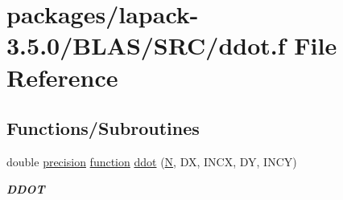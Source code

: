 \hypertarget{lapack-3_85_80_2BLAS_2SRC_2ddot_8f}{}\section{packages/lapack-\/3.5.0/\+B\+L\+A\+S/\+S\+R\+C/ddot.f File Reference}
\label{lapack-3_85_80_2BLAS_2SRC_2ddot_8f}
\subsection*{Functions/\+Subroutines}
\begin{DoxyCompactItemize}
\item 
double \hyperlink{numinquire_8h_a2c8e616467665d0b2814d4c1589ba74e}{precision} \hyperlink{afunc_8m_a7b5e596df91eadea6c537c0825e894a7}{function} \hyperlink{group__double__blas__level1_ga75066c4825cb6ff1c8ec4403ef8c843a}{ddot} (\hyperlink{polmisc_8c_a0240ac851181b84ac374872dc5434ee4}{N}, D\+X, I\+N\+C\+X, D\+Y, I\+N\+C\+Y)
\begin{DoxyCompactList}\small\item\em {\bfseries D\+D\+O\+T} \end{DoxyCompactList}\end{DoxyCompactItemize}
